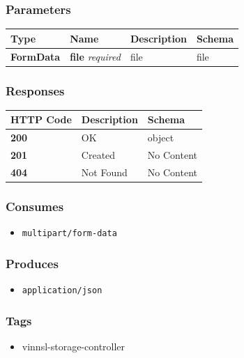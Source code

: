 \subsubsection{Parameters}\label{parameters-17}

\begin{longtable}[]{@{}llll@{}}
\toprule
Type & Name & Description & Schema\tabularnewline
\midrule
\endhead
\textbf{FormData} & \textbf{file} \emph{required} & file &
file\tabularnewline
\bottomrule
\end{longtable}

\subsubsection{Responses}\label{responses-21}

\begin{longtable}[]{@{}lll@{}}
\toprule
HTTP Code & Description & Schema\tabularnewline
\midrule
\endhead
\textbf{200} & OK & object\tabularnewline
\textbf{201} & Created & No Content\tabularnewline
\textbf{404} & Not Found & No Content\tabularnewline
\bottomrule
\end{longtable}

\subsubsection{Consumes}\label{consumes-9}

\begin{itemize}
\tightlist
\item
  \texttt{multipart/form-data}
\end{itemize}

\subsubsection{Produces}\label{produces-21}

\begin{itemize}
\tightlist
\item
  \texttt{application/json}
\end{itemize}

\subsubsection{Tags}\label{tags-21}

\begin{itemize}
\tightlist
\item
  vinnsl-storage-controller
\end{itemize}

